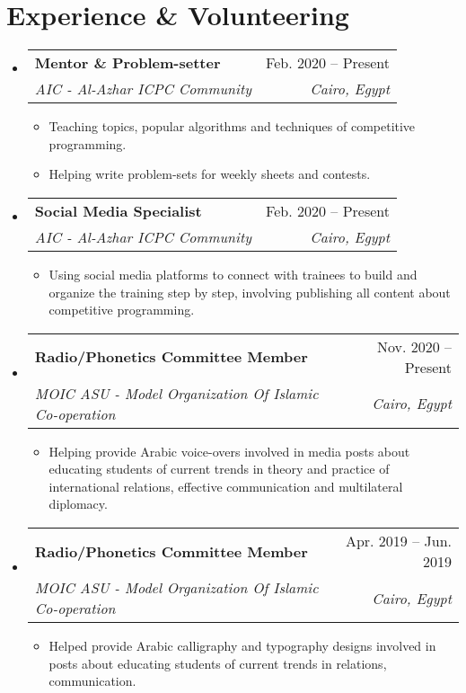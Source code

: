 \documentclass[letterpaper,11pt]{article}
\makeatletter
\newcommand{\resumeItem}[1]{
  \item\small{
    {#1 \vspace{-2pt}}
  }
}
\newcommand{\resumeSubheading}[4]{
  \vspace{-2pt}\item
    \begin{tabular*}{0.97\textwidth}[t]{l@{\extracolsep{\fill}}r}
      \textbf{#1} & #2 \\
      \textit{\small#3} & \textit{\small #4} \\
    \end{tabular*}\vspace{-7pt}
}
\newcommand{\resumeSubHeadingListStart}{\begin{itemize}[leftmargin=0.15in, label={}]}
\newcommand{\resumeSubHeadingListEnd}{\end{itemize}}
\newcommand{\resumeItemListStart}{\begin{itemize}}
\newcommand{\resumeItemListEnd}{\end{itemize}\vspace{-5pt}}
\makeatother
\begin{document}
\section{Experience \& Volunteering}
  \resumeSubHeadingListStart

    \resumeSubheading
      {Mentor \& Problem-setter}{Feb. 2020 -- Present}
      {AIC - Al-Azhar ICPC Community}{Cairo, Egypt}
      \resumeItemListStart
        \resumeItem{Teaching topics, popular algorithms and techniques of competitive programming.}
        \resumeItem{Helping write problem-sets for weekly sheets and contests.}
    \resumeItemListEnd

    \resumeSubheading
      {Social Media Specialist}{Feb. 2020 -- Present}
      {AIC - Al-Azhar ICPC Community}{Cairo, Egypt}
      \resumeItemListStart
        \resumeItem{Using social media platforms to connect with trainees to build and organize the training step by step, involving publishing all content about competitive programming.}
      \resumeItemListEnd

    \resumeSubheading
      {Radio/Phonetics Committee Member}{Nov. 2020 -- Present}
      {MOIC ASU - Model Organization Of Islamic Co-operation}{Cairo, Egypt}
      \resumeItemListStart
        \resumeItem{Helping provide Arabic voice-overs involved in media posts about educating students of current trends in theory and practice of international relations, effective communication and
multilateral diplomacy.}
      \resumeItemListEnd
      
      \resumeSubheading
      {Radio/Phonetics Committee Member}{Apr. 2019 -- Jun. 2019}
      {MOIC ASU - Model Organization Of Islamic Co-operation}{Cairo, Egypt}
      \resumeItemListStart
        \resumeItem{Helped provide Arabic calligraphy and typography designs involved in posts about
educating students of current trends in relations, communication.}
      \resumeItemListEnd
      
  \resumeSubHeadingListEnd

\end{document}
